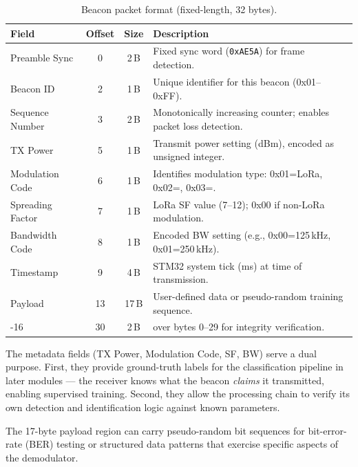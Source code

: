 \documentclass[11pt,letterpaper]{article}
\begin{document}
	\begin{table}[ht!]
		\centering
		\caption{Beacon packet format (fixed-length, 32 bytes).}
		\label{tab:packet}
		\renewcommand{\arraystretch}{1.3}
		\begin{tabularx}{\textwidth}{l c c X}
			\toprule
			\textbf{Field} & \textbf{Offset} & \textbf{Size} & \textbf{Description} \\
			\midrule
			Preamble Sync & 0 & 2\,B & Fixed sync word (\texttt{0xAE5A}) for frame detection. \\
			Beacon ID & 2 & 1\,B & Unique identifier for this beacon (0x01--0xFF). \\
			Sequence Number & 3 & 2\,B & Monotonically increasing counter; enables packet loss detection. \\
			TX Power & 5 & 1\,B & Transmit power setting (dBm), encoded as unsigned integer. \\
			Modulation Code & 6 & 1\,B & Identifies modulation type: 0x01=LoRa, 0x02=\FSK{}, 0x03=\OOK{}. \\
			Spreading Factor & 7 & 1\,B & LoRa SF value (7--12); 0x00 if non-LoRa modulation. \\
			Bandwidth Code & 8 & 1\,B & Encoded BW setting (e.g., 0x00=125\,kHz, 0x01=250\,kHz). \\
			Timestamp & 9 & 4\,B & STM32 system tick (ms) at time of transmission. \\
			Payload & 13 & 17\,B & User-defined data or pseudo-random training sequence. \\
			\CRC{}-16 & 30 & 2\,B & \CRC{} over bytes 0--29 for integrity verification. \\
			\bottomrule
		\end{tabularx}
	\end{table}
	
	\begin{tcolorbox}[infobox={Design Rationale: Why These Fields?}]
		The metadata fields (TX Power, Modulation Code, SF, BW) serve a dual purpose. First, they provide ground-truth labels for the \ML{} classification pipeline in later modules --- the receiver knows what the beacon \emph{claims} it transmitted, enabling supervised training. Second, they allow the \FPGA{} processing chain to verify its own detection and identification logic against known parameters.
		
		The 17-byte payload region can carry pseudo-random bit sequences for bit-error-rate (BER) testing or structured data patterns that exercise specific aspects of the demodulator.
	\end{tcolorbox}
	
\end{document}
